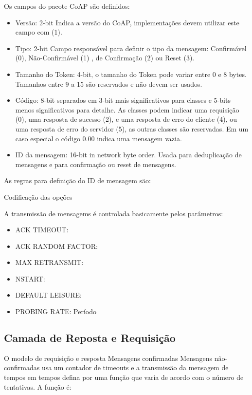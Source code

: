 Os campos do pacote CoAP s\~ao definidos:
\begin{itemize}
    \item Vers\~ao: 2-bit Indica a vers\~ao do CoAP, implementa\c{c}\~oes devem utilizar este campo com (1).
    \item Tipo: 2-bit Campo respons\'avel para definir o tipo da mensagem: Confirm\'avel (0), N\~ao-Confirm\'avel (1) , de Confirma\c{c}\~ao (2) ou Reset (3).
    \item Tamanho do Token: 4-bit, o tamanho do Token pode variar entre 0 e 8 bytes. Tamanhos entre 9 a 15 s\~ao reservados e n\~ao devem ser usados.
    \item C\'odigo: 8-bit separados em 3-bit mais significativos para classes e 5-bits menos significativos para detalhe. As classes podem indicar uma requisi\c{c}\~ao (0), uma resposta de sucesso (2), e uma resposta de erro do cliente (4), ou uma resposta de erro do servidor (5), as outras classes s\~ao reservadas. Em um caso especial o c\'odigo 0.00 indica uma mensagem vazia.
    \item ID da mensagem: 16-bit in network byte order. Usada para deduplica\c{c}\~ao de mensagens e para confirmação ou reset de mensagens.
\end{itemize}

As regras para defini\c{c}\~ao do ID de mensagem s\~ao:
   
Codifica\c{c}\~ao das op\c{c}\~oes

A transmiss\~ao de mensagems \'e controlada basicamente pelos par\^ametros:
\begin{itemize}
    \item ACK TIMEOUT:
    \item ACK RANDOM FACTOR:
    \item MAX RETRANSMIT:
    \item NSTART:
    \item DEFAULT LEISURE:
    \item PROBING RATE: Per\'iodo
\end{itemize}

\subsection{Camada de Reposta e Requisi\c{c}\~ao}
 O modelo de requisi\c{c}\~ao e resposta Mensagens confirmadas Mensagens n\~ao-confirmadas usa um contador de timeouts e a transmiss\~ao da mensagem de tempos em tempos defina por uma fun\c{c}\~ao que varia de acordo com o n\'umero de tentativas. A fun\c{c}\~ao \'e:
 
